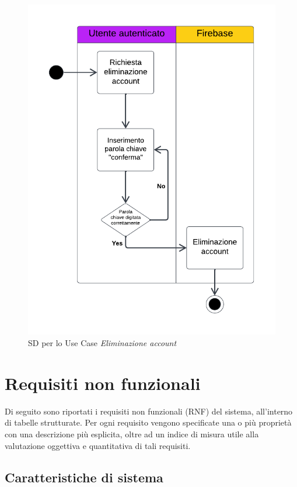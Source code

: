 \documentclass[11pt, a4paper]{article}
\theoremstyle{definition} %
\begin{document}
\begin{figure}[H]
\centering
\includegraphics[scale = 1]{materiale/ucdiagrams/swimlaneeliminaaccount.pdf}
\caption{SD per lo Use Case \textit{Eliminazione account}}
\label{deleteaccount}
\end{figure}

\newpage
\section{Requisiti non funzionali}
Di seguito sono riportati i requisiti non funzionali (RNF)
del sistema, all'interno di tabelle strutturate. Per ogni requisito vengono
specificate una o più proprietà con una descrizione più esplicita,
oltre ad un indice di misura utile alla valutazione oggettiva
e quantitativa di tali requisiti.

\subsection{Caratteristiche di sistema}
\end{document}
